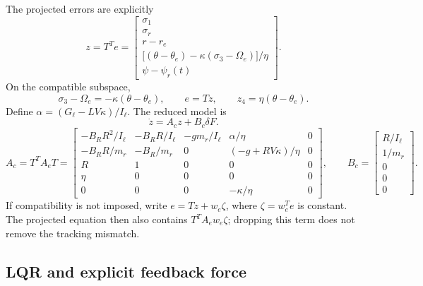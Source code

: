 The projected errors are explicitly
\begin{equation}
\boxed{z=T^Te=\begin{bmatrix}
\sigma_1\\\sigma_r\\r-r_e\\
\bigl[(\theta-\theta_e)-\kappa(\sigma_3-\Omega_e)\bigr]/\eta\\
\psi-\psi_r(t)
\end{bmatrix}.}
\end{equation}
On the compatible subspace,
\begin{equation}
\sigma_3-\Omega_e=-\kappa(\theta-\theta_e),\qquad
e=Tz,\qquad z_4=\eta(\theta-\theta_e).
\end{equation}
Define $\alpha=(G_\ell-LV\kappa)/I_\ell$. The reduced model is
\begin{equation}
\dot z=A_cz+B_c\delta F.
\end{equation}
\begin{equation}
A_c=T^TA_eT=
\begin{bmatrix}
-B_RR^2/I_\ell&-B_RR/I_\ell&-gm_r/I_\ell&\alpha/\eta&0\\
-B_RR/m_r&-B_R/m_r&0&(-g+RV\kappa)/\eta&0\\
R&1&0&0&0\\
\eta&0&0&0&0\\
0&0&0&-\kappa/\eta&0
\end{bmatrix},\qquad
B_c=\begin{bmatrix}R/I_\ell\\1/m_r\\0\\0\\0\end{bmatrix}.
\end{equation}
If compatibility is not imposed, write $e=Tz+w_e\zeta$, where
$\zeta=w_e^Te$ is constant. The projected equation then also contains
$T^TA_ew_e\zeta$; dropping this term does not remove the tracking mismatch.

\subsection{LQR and explicit feedback force}

